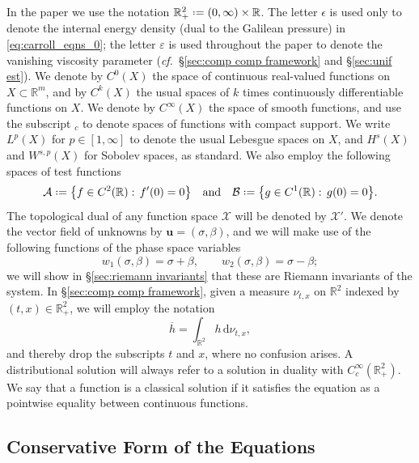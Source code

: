 \documentclass[11pt,a4paper,reqno]{amsart}
\numberwithin{equation}{section}
\theoremstyle{definition}
\theoremstyle{remark}
\newcommand{\bu}{\mathbf{u}}
\renewcommand{\d}{\, \mathrm{d}}
\newcommand*{\defeq}{\mathrel{\vcenter{\baselineskip0.5ex \lineskiplimit0pt
                     \hbox{\scriptsize.}\hbox{\scriptsize.}}}%
                     =}
\begin{document}
{In the paper we use the notation $\mathbb{R}^2_+ \defeq (0,\infty) \times \mathbb{R}$. The letter $\epsilon$ is used only to denote the internal energy density (dual to the Galilean pressure) in \eqref{eq:carroll_eqns_0}; the letter $\varepsilon$ is used throughout the paper to denote the vanishing viscosity parameter (\textit{cf.}~\S \ref{sec:comp comp framework} and \S \ref{sec:unif est}). We denote by $C^0(X)$ the space of continuous real-valued functions on $X \subset \mathbb{R}^m$, and by $C^k(X)$ the usual spaces of $k$ times continuously differentiable functions on $X$. We denote by $C^\infty(X)$ the space of smooth functions, and use the subscript ${}_c$ to denote spaces of functions with compact support. We write $L^p(X)$ for $p \in [1,\infty]$ to denote the usual Lebesgue spaces on $X$, and $H^s(X)$ and $W^{s,p}(X)$ for Sobolev spaces, as standard. We also employ the following spaces of test functions 
\begin{align}
\mathcal{A} \defeq \big\{ f \in C^2(\mathbb{R}): \, f'(0) = 0 \big\} \quad \text{and} \quad \mathcal{B} \defeq \big\{ g \in C^1(\mathbb{R}): \, g(0) = 0 \big\}. \label{eq:admissible test functions} 
    \end{align}
    The topological dual of any function space $\mathcal{X}$ will be denoted by $\mathcal{X}'$. We denote the vector field of unknowns by $\bu = (\sigma,\beta)$, and we will make use of the following functions of the phase space variables 
\begin{equation*}
    w_1(\sigma,\beta) = \sigma + \beta, \qquad w_2(\sigma,\beta) = \sigma - \beta; 
\end{equation*}
we will show in \S \ref{sec:riemann invariants} that these are Riemann invariants of the system. In \S \ref{sec:comp comp framework}, given a measure $\nu_{t,x}$ on $\mathbb{R}^2$ indexed by $(t,x) \in \mathbb{R}^2_+$, we will employ the notation 
\begin{equation*}
    \overline{h} = \int_{\mathbb{R}^2} h \d \nu_{t,x} ,
\end{equation*}
and thereby drop the subscripts $t$ and $x$, where no confusion arises. A distributional solution will always refer to a solution in duality with $C^\infty_c(\mathbb{R}^2_+)$. We say that a function is a classical solution if it satisfies the equation as a pointwise equality between continuous functions. 








\subsection{Conservative Form of the Equations}\label{sec:conservative form}



}
\end{document}
